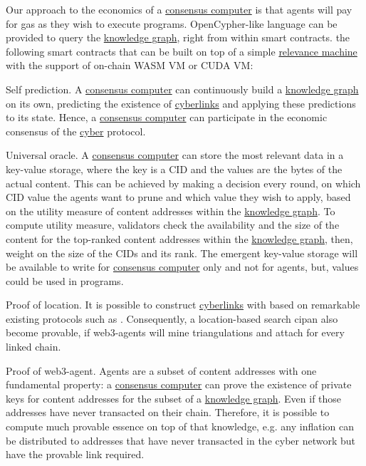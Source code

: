 \documentclass[8pt,oneside]{amsart}
\newcommand{\linkgreen}[2]{\href{#1}{\color{green}{#2}}}
\begin{document}
Our approach to the economics of a {\hyperref[consensus-computer]{consensus computer}} is that agents will pay for gas as they wish to execute programs. OpenCypher-like language can be provided to query the {\hyperref[knowledge-graph]{knowledge graph}}, right from within smart contracts. \linkgreen{https://medium.com/@karpathy/software-2-0-a64152b37c35}{We can envision} the following smart contracts that can be built on top of a simple {\hyperref[relevance-machine]{relevance machine}} with the support of on-chain WASM VM or CUDA VM:

Self prediction. A {\hyperref[consensus-computer]{consensus computer}} can continuously build a {\hyperref[knowledge-graph]{knowledge graph}} on its own, predicting the existence of {\hyperref[cyberlinks]{cyberlinks}} and applying these predictions to its state. Hence, a {\hyperref[consensus-computer]{consensus computer}} can participate in the economic consensus of the {\hyperref[cyber]{cyber}} protocol.

Universal oracle. A {\hyperref[consensus-computer]{consensus computer}} can store the most relevant data in a key-value storage, where the key is a CID and the values are the bytes of the actual content. This can be achieved by making a decision every round, on which CID value the agents want to prune and which value they wish to apply, based on the utility measure of content addresses within the {\hyperref[knowledge-graph]{knowledge graph}}. To compute utility measure, validators check the availability and the size of the content for the top-ranked content addresses within the {\hyperref[knowledge-graph]{knowledge graph}}, then, weight on the size of the CIDs and its rank. The emergent key-value storage will be available to write for {\hyperref[consensus-computer]{consensus computer}} only and not for agents, but, values could be used in programs.

Proof of location. It is possible to construct {\hyperref[cyberlinks]{cyberlinks}} with \linkgreen{https://ipfs.io/ipfs/QmZYKGuLHf2h1mZrhiP2FzYsjj3tWt2LYduMCRbpgi5pKG}{Proof-of-Location} based on remarkable existing protocols such as \linkgreen{https://ipfs.io/ipfs/QmZYKGuLHf2h1mZrhiP2FzYsjj3tWt2LYduMCRbpgi5pKG}{FOAM}. Consequently, a location-based search cipan also become provable, if web3-agents will mine triangulations and attach \linkgreen{https://ipfs.io/ipfs/QmZYKGuLHf2h1mZrhiP2FzYsjj3tWt2LYduMCRbpgi5pKG}{proof-of-location} for every linked chain.

Proof of web3-agent. Agents are a subset of content addresses with one fundamental property: a {\hyperref[consensus-computer]{consensus computer}} can prove the existence of private keys for content addresses for the subset of a {\hyperref[knowledge-graph]{knowledge graph}}. Even if those addresses have never transacted on their chain. Therefore, it is possible to compute much provable essence on top of that knowledge, e.g. any inflation can be distributed to addresses that have never transacted in the cyber network but have the provable link required.
\end{document}
